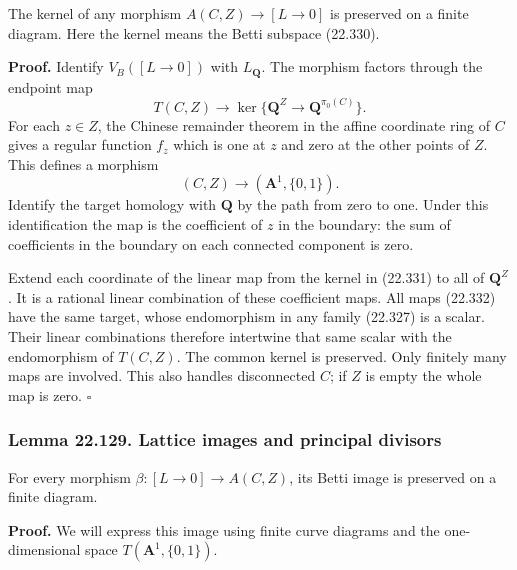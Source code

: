 \documentclass[
  11pt,
  a4paper,
]{article}
\begin{document}
The kernel of any morphism \(A(C,Z)\to [L\to0]\) is preserved on a
finite diagram. Here the kernel means the Betti subspace (22.330).

\textbf{Proof.} Identify \(V_B([L\to0])\) with \(L_{\mathbf Q}\). The
morphism factors through the endpoint map \[
 T(C,Z)\longrightarrow
 \ker\{\mathbf Q^Z\longrightarrow\mathbf Q^{\pi_0(C)}\}.
 \tag{22.331}
\] For each \(z\in Z\), the Chinese remainder theorem in the affine
coordinate ring of \(C\) gives a regular function \(f_z\) which is one
at \(z\) and zero at the other points of \(Z\). This defines a morphism
\[
 (C,Z)\longrightarrow(\mathbf A^1,\{0,1\}).
 \tag{22.332}
\] Identify the target homology with \(\mathbf Q\) by the path from zero
to one. Under this identification the map is the coefficient of \(z\) in
the boundary: the sum of coefficients in the boundary on each connected
component is zero.

Extend each coordinate of the linear map from the kernel in (22.331) to
all of \(\mathbf Q^Z\). It is a rational linear combination of these
coefficient maps. All maps (22.332) have the same target, whose
endomorphism in any family (22.327) is a scalar. Their linear
combinations therefore intertwine that same scalar with the endomorphism
of \(T(C,Z)\). The common kernel is preserved. Only finitely many maps
are involved. This also handles disconnected \(C\); if \(Z\) is empty
the whole map is zero. \(\square\)

\subsubsection{Lemma 22.129. Lattice images and principal
divisors}\label{lemma-22.129.-lattice-images-and-principal-divisors}

For every morphism \(\beta:[L\to0]\to A(C,Z)\), its Betti image is
preserved on a finite diagram.

\textbf{Proof.} We will express this image using finite curve diagrams
and the one-dimensional space \(T(\mathbf A^1,\{0,1\})\).
\end{document}
